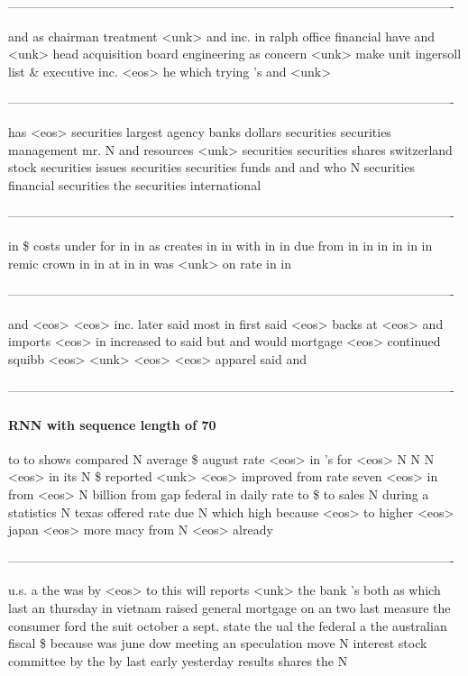 \begin{enumerate}
----------------------------------------------------------------------------------------------------------

and as chairman treatment <unk> and inc. in ralph office financial have and <unk> head acquisition board engineering as concern <unk> make unit ingersoll list \& executive inc. <eos> he which trying 's and <unk>

----------------------------------------------------------------------------------------------------------

has <eos> securities largest agency banks dollars securities securities management mr. N and resources <unk> securities securities shares switzerland stock securities issues securities securities funds and and who N securities financial securities the securities international

----------------------------------------------------------------------------------------------------------

in \$ costs under for in in as creates in in with in in due from in in in in in in remic crown in in at in in was <unk> on rate in in

----------------------------------------------------------------------------------------------------------

and <eos> <eos> inc. later said most in first said <eos> backs at <eos> and imports <eos> in increased to said but and would mortgage <eos> continued squibb <eos> <unk> <eos> <eos> apparel said and

----------------------------------------------------------------------------------------------------------


\paragraph{RNN with sequence length of 70}
to to shows compared N average \$ august rate <eos> in 's for <eos> N N N <eos> in its N \$ reported <unk> <eos> improved from rate seven <eos> in from <eos> N billion from gap federal in daily rate to \$ to sales N during a statistics N texas offered rate due N which high because <eos> to higher <eos> japan <eos> more macy from N <eos> already

----------------------------------------------------------------------------------------------------------

u.s. a the was by <eos> to this will reports <unk> the bank 's both as which last an thursday in vietnam raised general mortgage on an two last measure the consumer ford the suit october a sept. state the ual the federal a the australian fiscal \$ because was june dow meeting an speculation move N interest stock committee by the by last early yesterday results shares the N


\end{enumerate}
